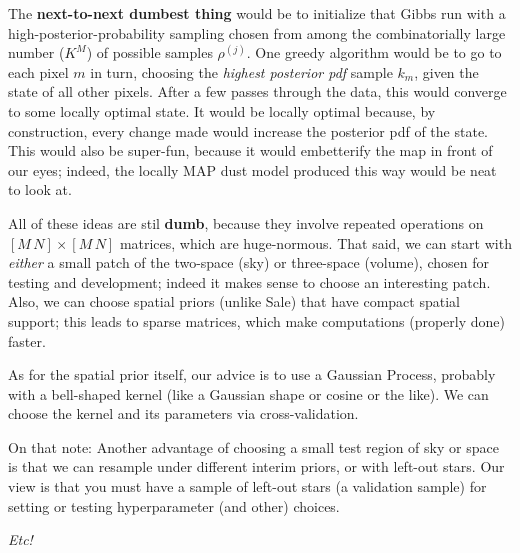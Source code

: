 \documentclass[12pt, letterpaper]{article}
\begin{document}
The \textbf{next-to-next dumbest thing} would be to initialize that Gibbs run
  with a high-posterior-probability sampling chosen from among the combinatorially large
  number ($K^M$) of possible samples $\rho^{(j)}$.
One greedy algorithm would be to go to each pixel $m$ in turn,
  choosing the \emph{highest posterior pdf} sample $k_m$,
  given the state of all other pixels.
After a few passes through the data, this would converge
  to some locally optimal state.
It would be locally optimal because, by construction,
  every change made would increase the posterior pdf of the state.
This would also be super-fun, because it would embetterify the map in front of our eyes;
  indeed, the locally MAP dust model produced this way would be neat to look at.

All of these ideas are stil \textbf{dumb},
  because they involve repeated operations on $[M\,N]\times[M\,N]$ matrices,
  which are huge-normous.
That said, we can start with \emph{either}
  a small patch of the two-space (sky) or three-space (volume),
  chosen for testing and development;
  indeed it makes sense to choose an interesting patch.
Also, we can choose spatial priors (unlike Sale)
  that have compact spatial support;
  this leads to sparse matrices,
  which make computations (properly done) faster.

As for the spatial prior itself,
  our advice is to use a Gaussian Process,
  probably with a bell-shaped kernel (like a Gaussian shape or cosine or the like).
We can choose the kernel and its parameters via cross-validation.

On that note:
Another advantage of choosing a small test region of sky or space
  is that we can resample under different interim priors,
  or with left-out stars.
Our view is that you must have a sample of left-out stars
  (a validation sample)
  for setting or testing hyperparameter (and other) choices.

\textsl{Etc!}
\end{document}
